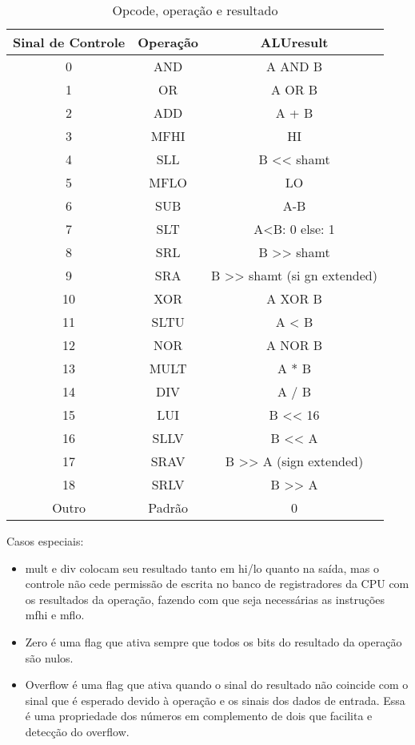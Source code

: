 	\begin{table}[H]
	\begin{tabular}{|c|c|c|} \hline
	Sinal de Controle & Operação & ALUresult \\ \hline
0 & AND & A AND B \\ \hline
1 & OR & A OR B \\ \hline
2 & ADD & A + B \\ \hline
3 & MFHI & HI \\ \hline
4 & SLL & B << shamt \\ \hline
5 & MFLO  & LO \\ \hline
6 &  SUB  & A-B \\ \hline
7  & SLT  & A<B: 0 else: 1 \\ \hline
8  & SRL  & B >> shamt \\ \hline
9  & SRA  & B >> shamt (si	gn extended) \\ \hline
10  & XOR  & A XOR B \\ \hline
11  & SLTU  & A < B \\ \hline
12 &  NOR  & A NOR B \\ \hline
13 &  MULT  & A * B \\ \hline
14 &  DIV  & A / B \\ \hline
15 &  LUI  & B << 16 \\ \hline
16  & SLLV & B << A \\ \hline
17 &  SRAV &  B >> A (sign extended) \\ \hline
18  & SRLV  & B >> A \\ \hline
Outro  & Padrão  & 0 \\ \hline
	\end{tabular}
	\caption{Opcode, operação e resultado}
	\end{table}
	
	Casos especiais:
\begin{itemize}
\item mult e div colocam seu resultado tanto em hi/lo quanto na saída, mas o controle não cede permissão de escrita no banco de registradores da CPU com os resultados da operação, fazendo com que seja necessárias as instruções mfhi e mflo.
\item Zero é uma flag que ativa sempre que todos os bits do resultado da operação são nulos.
\item Overflow é uma flag que ativa quando o sinal do resultado não coincide com o sinal que é esperado devido à operação e os sinais dos dados de entrada. Essa é uma propriedade dos números em complemento de dois que facilita e detecção do overflow.
\end{itemize}	


